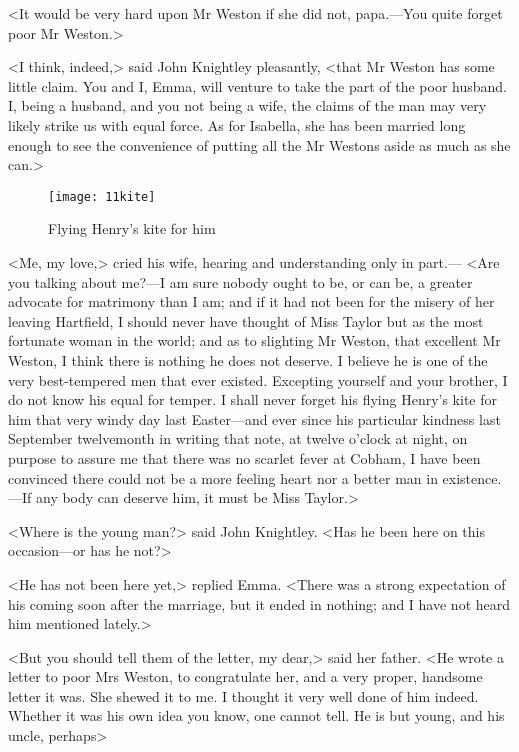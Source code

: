 <It would be very hard upon Mr Weston if she did not, papa.—You quite forget poor Mr Weston.>

<I think, indeed,> said John Knightley pleasantly, <that Mr Weston has some little claim. You and I, Emma, will venture to take the part of the poor husband. I, being a husband, and you not being a wife, the claims of the man may very likely strike us with equal force. As for Isabella, she has been married long enough to see the convenience of putting all the Mr Westons aside as much as she can.>

\begin{figure}[tbph]
\centering
\texttt{[image: 11kite]}
\caption{Flying Henry's kite for him}
\end{figure}

<Me, my love,> cried his wife, hearing and understanding only in part.— <Are you talking about me?—I am sure nobody ought to be, or can be, a greater advocate for matrimony than I am; and if it had not been for the misery of her leaving Hartfield, I should never have thought of Miss Taylor but as the most fortunate woman in the world; and as to slighting Mr Weston, that excellent Mr Weston, I think there is nothing he does not deserve. I believe he is one of the very best-tempered men that ever existed. Excepting yourself and your brother, I do not know his equal for temper. I shall never forget his flying Henry's kite for him that very windy day last Easter—and ever since his particular kindness last September twelvemonth in writing that note, at twelve o'clock at night, on purpose to assure me that there was no scarlet fever at Cobham, I have been convinced there could not be a more feeling heart nor a better man in existence.—If any body can deserve him, it must be Miss Taylor.>

<Where is the young man?> said John Knightley. <Has he been here on this occasion—or has he not?>

<He has not been here yet,> replied Emma. <There was a strong expectation of his coming soon after the marriage, but it ended in nothing; and I have not heard him mentioned lately.>

<But you should tell them of the letter, my dear,> said her father. <He wrote a letter to poor Mrs Weston, to congratulate her, and a very proper, handsome letter it was. She shewed it to me. I thought it very well done of him indeed. Whether it was his own idea you know, one cannot tell. He is but young, and his uncle, perhaps\longdash>

